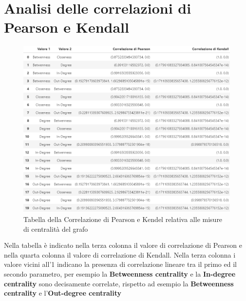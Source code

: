 \documentclass[a4paper,11pt]{report}
\begin{document}
\section{Analisi delle correlazioni di Pearson e Kendall}

\begin{figure}[h]
	\centering
	\includegraphics[width=1\linewidth]{tabella}
	\caption[]{Tabella della Correlazione di Pearson e Kendel relativa alle misure di centralità del grafo}
\end{figure}
Nella tabella è indicato nella terza colonna il valore di correlazione di Pearson e nella quarta colonna il valore di correlazione di Kendall.
Nella terza colonna i valore vicini all'1 indicano la presenza di correlazione lineare tra il primo ed il secondo parametro, per esempio la \textbf{Betweenness centrality} e la \textbf{In-degree centrality} sono decisamente correlate, rispetto ad esempio la \textbf{Betweenness centrality} e l'\textbf{Out-degree centrality}
\end{document}
